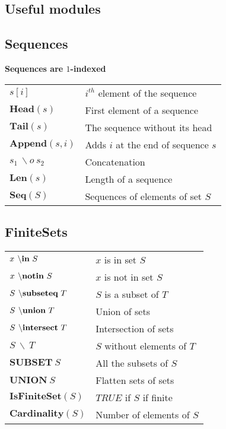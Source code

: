 \documentclass[10pt,landscape]{article}
\begin{document}
\begin{multicols}{3}
{    \section{Useful modules}

    \subsection{Sequences}
 
    \textbf{Sequences are $1$-indexed}
    
    \begin{tabular}{p{}|p{}}
      $s[i]$ & $i^{th}$ element of the sequence\\ 
      $\textbf{Head}(s)$ & First element of a sequence\\
      $\textbf{Tail}(s)$ & The sequence without its head\\
      $\textbf{Append}(s, i)$ & Adds $i$ at the end of sequence $s$\\
      $s_1~\backslash o~s_2$ & Concatenation \\
      $\textbf{Len}(s)$ & Length of a sequence \\
      $\textbf{Seq}(S)$ & Sequences of elements of set $S$\\
    \end{tabular}

    \subsection{FiniteSets}
    
    \begin{tabular}{p{}|p{}}
      $x \textbf{$~\backslash$in}~S$ & $x$ is in set $S$\\
      $x \textbf{$~\backslash$notin}~S$ & $x$ is not in set $S$\\
      $S \textbf{$~\backslash$subseteq}~T$ & $S$ is a subset of $T$\\
      $S \textbf{$~\backslash$union}~T$ & Union of sets\\
      $S \textbf{$~\backslash$intersect}~T$ & Intersection of sets\\
      $S~\backslash~T$ & $S$ without elements of $T$\\
      $\textbf{SUBSET}~S$ & All the subsets of $S$\\
      $\textbf{UNION}~S$ & Flatten sets of sets\\
      $\textbf{IsFiniteSet}(S)$ & $TRUE$ if $S$ if finite\\
      $\textbf{Cardinality}(S)$ & Number of elements of $S$
    \end{tabular}

}
\end{multicols}
\end{document}
